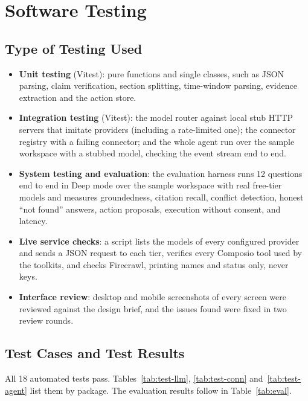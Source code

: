 \documentclass[oneside,a4paper,12pt]{report}
\begin{document}
\chapter{Software Testing}
\label{ch:testing}
 \section{Type of Testing Used}
\begin{itemize}
\item \textbf{Unit testing} (Vitest): pure functions and single classes, such as JSON parsing, claim verification, section splitting, time-window parsing, evidence extraction and the action store.
\item \textbf{Integration testing} (Vitest): the model router against local stub HTTP servers that imitate providers (including a rate-limited one); the connector registry with a failing connector; and the whole agent run over the sample workspace with a stubbed model, checking the event stream end to end.
\item \textbf{System testing and evaluation}: the evaluation harness runs 12 questions end to end in Deep mode over the sample workspace with real free-tier models and measures groundedness, citation recall, conflict detection, honest ``not found'' answers, action proposals, execution without consent, and latency.
\item \textbf{Live service checks}: a script lists the models of every configured provider and sends a JSON request to each tier, verifies every Composio tool used by the toolkits, and checks Firecrawl, printing names and status only, never keys.
\item \textbf{Interface review}: desktop and mobile screenshots of every screen were reviewed against the design brief, and the issues found were fixed in two review rounds.
\end{itemize}
   \section{Test Cases and Test Results}
All 18 automated tests pass. Tables~\ref{tab:test-llm}, \ref{tab:test-conn} and~\ref{tab:test-agent} list them by package. The evaluation results follow in Table~\ref{tab:eval}.
\end{document}
